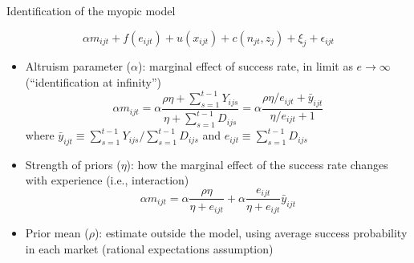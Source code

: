 \documentclass[slides, aspectratio=169]{beamer}
\begin{document}
\begin{frame}[noframenumbering, t]{Identification of the myopic model}
\label{identification details}

\vskip-12pt

$$\alpha m_{ijt} + f(e_{ijt}) + u(x_{ijt}) + c(n_{jt}, z_j) + \xi_j + \epsilon_{ijt}$$

\begin{itemize}

\item Altruism parameter ($\alpha$): marginal effect of success rate, in limit as $e \rightarrow \infty$ (``identification at infinity'')
\[
\alpha m_{ijt} 
= \alpha \frac{ \rho \eta +  \sum_{s=1}^{t-1} Y_{ijs} }{ \eta + \sum_{s=1}^{t-1} D_{ijs} }
= \alpha \frac{ \rho \eta/e_{ijt} + \bar y_{ijt} }{ \eta/e_{ijt} + 1 }
\]
where $\bar y_{ijt} \equiv \sum_{s=1}^{t-1} Y_{ijs} / \sum_{s=1}^{t-1} D_{ijs}$
and $e_{ijt} \equiv \sum_{s=1}^{t-1} D_{ijs}$
\vskip3pt
\medskip

\item Strength of priors ($\eta$):
how the marginal effect of the success rate changes with experience (i.e., interaction)
\[
\alpha m_{ijt} 
= \alpha \frac{ \rho \eta }{ \eta + e_{ijt} } 
+ \alpha \frac{ e_{ijt} }{ \eta + e_{ijt} } \bar y_{ijt}
\]
\vskip-8pt
\medskip


\item Prior mean ($\rho$): estimate outside the model, using average success probability in each market (rational expectations assumption)
\medskip

\hyperlink{identification}{}

\end{itemize}
\end{frame}

\end{document}
